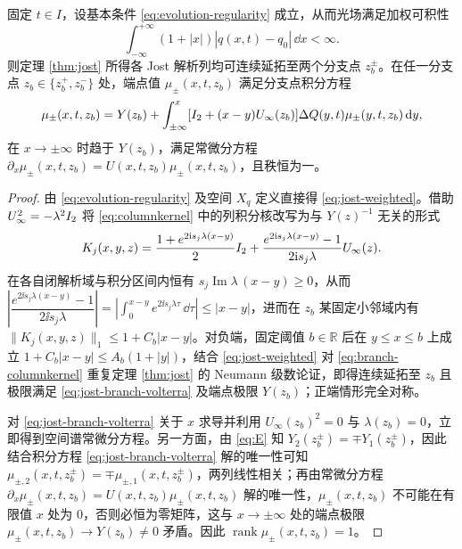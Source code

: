 \begin{lemma}\label{prop:jost-branch}
固定 $t\in I$，设基本条件 \eqref{eq:evolution-regularity} 成立，从而光场满足加权可积性
\begin{equation}\label{eq:jost-weighted}
\int_{-\infty}^{+\infty}(1+|x|)|q(x,t)-q_0|\,\dd x<\infty.
\end{equation}
则定理 \ref{thm:jost} 所得各 Jost 解析列均可连续延拓至两个分支点 $z_b^\pm$。在任一分支点 $z_b\in\{z_b^+,z_b^-\}$ 处，端点值 $\mu_\pm(x,t,z_b)$ 满足分支点积分方程
\begin{equation}\label{eq:jost-branch-volterra}
\mu_\pm(x,t,z_b)=Y(z_b)+\int_{\pm\infty}^{x}
[I_2+(x-y)U_\infty(z_b)]\Delta Q(y,t)\mu_\pm(y,t,z_b)\,\mathrm{d} y,
\end{equation}
在 $x\to\pm\infty$ 时趋于 $Y(z_b)$，满足常微分方程 $\partial_x\mu_\pm(x,t,z_b)=U(x,t,z_b)\mu_\pm(x,t,z_b)$，且秩恒为一。
\end{lemma}
\begin{proof}
由 \eqref{eq:evolution-regularity} 及空间 $X_q$ 定义直接得 \eqref{eq:jost-weighted}。借助 $U_\infty^2=-\lambda^2I_2$ 将 \eqref{eq:columnkernel} 中的列积分核改写为与 $Y(z)^{-1}$ 无关的形式
\begin{equation}\label{eq:branch-columnkernel}
K_j(x,y,z)=\dfrac{1+e^{2\mathrm{i} s_j\lambda(x-y)}}{2}I_2
+\dfrac{e^{2\mathrm{i} s_j\lambda(x-y)}-1}{2\mathrm{i} s_j\lambda}U_\infty(z).
\end{equation}
在各自闭解析域与积分区间内恒有 $s_j\operatorname{Im}\lambda\,(x-y)\ge0$，从而 $\left|\dfrac{e^{2\ii s_j\lambda(x-y)}-1}{2\ii s_j\lambda}\right|=\left|\int_0^{x-y}e^{2\ii s_j\lambda\tau}\,\dd\tau\right|\le|x-y|$，进而在 $z_b$ 某固定小邻域内有 $\|K_j(x,y,z)\|_1\le1+C_b|x-y|$。对负端，固定阈值 $b\in\mathbb R$ 后在 $y\le x\le b$ 上成立 $1+C_b|x-y|\le A_b(1+|y|)$，结合 \eqref{eq:jost-weighted} 对 \eqref{eq:branch-columnkernel} 重复定理 \ref{thm:jost} 的 Neumann 级数论证，即得连续延拓至 $z_b$ 且极限满足 \eqref{eq:jost-branch-volterra} 及端点极限 $Y(z_b)$；正端情形完全对称。

对 \eqref{eq:jost-branch-volterra} 关于 $x$ 求导并利用 $U_\infty(z_b)^2=0$ 与 $\lambda(z_b)=0$，立即得到空间谱常微分方程。另一方面，由 \eqref{eq:E} 知 $Y_2(z_b^\pm)=\mp Y_1(z_b^\pm)$，因此结合积分方程 \eqref{eq:jost-branch-volterra} 解的唯一性可知 $\mu_{\pm,2}(x,t,z_b^\pm)=\mp\mu_{\pm,1}(x,t,z_b^\pm)$，两列线性相关；再由常微分方程 $\partial_x\mu_\pm(x,t,z_b)=U(x,t,z_b)\mu_\pm(x,t,z_b)$ 解的唯一性，$\mu_\pm(x,t,z_b)$ 不可能在有限值 $x$ 处为 $0$，否则必恒为零矩阵，这与 $x\to\pm\infty$ 处的端点极限 $\mu_\pm(x,t,z_b)\to Y(z_b)\ne0$ 矛盾。因此 $\operatorname{rank}\mu_\pm(x,t,z_b)=1$。
\end{proof}

